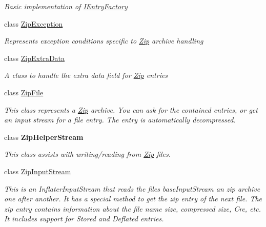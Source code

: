 \begin{DoxyCompactItemize}
\begin{DoxyCompactList}\small\item\em Basic implementation of \hyperlink{interface_i_c_sharp_code_1_1_sharp_zip_lib_1_1_zip_1_1_i_entry_factory}{I\+Entry\+Factory} \end{DoxyCompactList}\item 
class \hyperlink{class_i_c_sharp_code_1_1_sharp_zip_lib_1_1_zip_1_1_zip_exception}{Zip\+Exception}
\begin{DoxyCompactList}\small\item\em Represents exception conditions specific to \hyperlink{namespace_i_c_sharp_code_1_1_sharp_zip_lib_1_1_zip}{Zip} archive handling \end{DoxyCompactList}\item 
class \hyperlink{class_i_c_sharp_code_1_1_sharp_zip_lib_1_1_zip_1_1_zip_extra_data}{Zip\+Extra\+Data}
\begin{DoxyCompactList}\small\item\em A class to handle the extra data field for \hyperlink{namespace_i_c_sharp_code_1_1_sharp_zip_lib_1_1_zip}{Zip} entries \end{DoxyCompactList}\item 
class \hyperlink{class_i_c_sharp_code_1_1_sharp_zip_lib_1_1_zip_1_1_zip_file}{Zip\+File}
\begin{DoxyCompactList}\small\item\em This class represents a \hyperlink{namespace_i_c_sharp_code_1_1_sharp_zip_lib_1_1_zip}{Zip} archive. You can ask for the contained entries, or get an input stream for a file entry. The entry is automatically decompressed. \end{DoxyCompactList}\item 
class {\bfseries Zip\+Helper\+Stream}
\begin{DoxyCompactList}\small\item\em This class assists with writing/reading from \hyperlink{namespace_i_c_sharp_code_1_1_sharp_zip_lib_1_1_zip}{Zip} files. \end{DoxyCompactList}\item 
class \hyperlink{class_i_c_sharp_code_1_1_sharp_zip_lib_1_1_zip_1_1_zip_input_stream}{Zip\+Input\+Stream}
\begin{DoxyCompactList}\small\item\em This is an Inflater\+Input\+Stream that reads the files base\+Input\+Stream an zip archive one after another. It has a special method to get the zip entry of the next file. The zip entry contains information about the file name size, compressed size, Crc, etc. It includes support for Stored and Deflated entries. ~\newline

\end{DoxyCompactList}
\end{DoxyCompactItemize}
